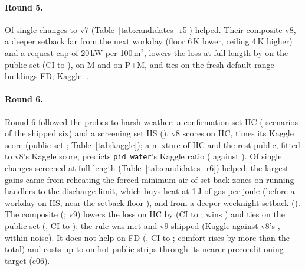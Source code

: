\documentclass{article}
\begin{document}
\paragraph{Round 5.}
Of \RFiveNSingles{} single changes to v7 (Table~\ref{tab:candidates_r5}) \RFiveNHelps{} helped. Their composite v8, a
deeper setback far from the next workday (floor 6\,K lower, ceiling 4\,K higher) and a request cap of 20\,kW per
100\,m$^2$, lowers the loss at full length by
\RFiveConfPubRelAbs{} on the public set (CI \RFiveConfPubRelHiAbs{} to \RFiveConfPubRelLoAbs), \RFiveConfMinnRelAbs{} on
M and \RFiveConfPubMinnRelAbs{} on P+M, and ties on the fresh default-range buildings FD; Kaggle: \RFiveKagVEight.

\paragraph{Round 6.}
Round 6 followed the probes to harsh weather: a confirmation set HC (\RSixHarshCN{} scenarios
of the shipped six) and a screening set HS (\RSixHarshSN). v8 scores \RSixHarshCVEight{} on HC,
\RSixHarshCLevel{} times its Kaggle score (public set \RSixPubLevel; Table~\ref{tab:kaggle}); a mixture of
\RSixMixWPct{} HC and the rest public, fitted to v8's Kaggle score, predicts \texttt{pid\_water}'s Kaggle ratio
(\RSixMixPid{} against \RSixKagRatioPid). Of \RSixNSingles{} single changes screened at full length
(Table~\ref{tab:candidates_r6}) \RSixNHelps{} helped; the largest gains came from reheating the forced minimum air of
set-back zones on running handlers to the discharge limit, which buys heat at 1\,J of gas per joule (before a workday
\RSixScrCElevenHsRel{} on HS; near the setback floor \RSixScrCNineHsRel), and from a deeper weeknight setback
(\RSixScrCEightHsRel). The composite
(\RSixCompMembers; v9) lowers the loss on HC by \RSixConfHarshCRelAbs{} (CI \RSixConfHarshCRelHiAbs{} to
\RSixConfHarshCRelLoAbs; wins \RSixConfHarshCWins) and ties on the public set (\RSixConfPubRel, CI \RSixConfPubRelLo{} to
\RSixConfPubRelHi): the rule was met and v9 shipped (Kaggle \RSevKagVNine{} against v8's \RSixKagVEight, within noise).
It does not help on FD (\RSixConfFreshDefRel, CI \RSixConfFreshDefRelLo{} to \RSixConfFreshDefRelHi; comfort rises by
more than the total) and costs up to \RSixConfPubWorstRel{} on hot public strips through its nearer preconditioning
target (c06).
\end{document}
